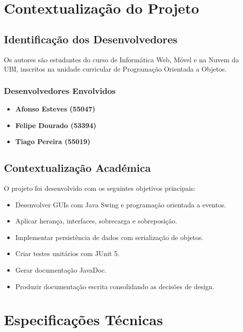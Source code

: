 \documentclass[a4paper,12pt]{article}
\begin{document}
\section{Contextualização do Projeto}

\subsection{Identificação dos Desenvolvedores}
Os autores são estudantes do curso de Informática Web, Móvel e na Nuvem da \ac{UBI}, inscritos na unidade curricular de Programação Orientada a Objetos.

\subsubsection{Desenvolvedores Envolvidos}
\begin{itemize}
    \item \textbf{Afonso Esteves (55047)}
    \item \textbf{Felipe Dourado (53394)}
    \item \textbf{Tiago Pereira (55019)}
\end{itemize}

\subsection{Contextualização Académica}
O projeto foi desenvolvido com os seguintes objetivos principais:
\begin{itemize}
    \item Desenvolver GUIs com Java Swing e programação orientada a eventos.
    \item Aplicar herança, interfaces, sobrecarga e sobreposição.
    \item Implementar persistência de dados com serialização de objetos.
    \item Criar testes unitários com JUnit 5.
    \item Gerar documentação JavaDoc.
    \item Produzir documentação escrita consolidando as decisões de design.
\end{itemize}

\section{Especificações Técnicas}
\end{document}
